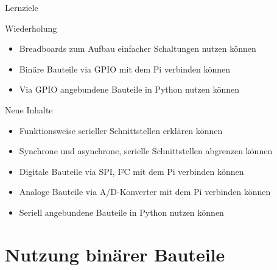 \begin{frame}{Lernziele}
    \begin{block}{Wiederholung}
        \begin{itemize}
            \item Breadboards zum Aufbau einfacher Schaltungen nutzen können
            \item Binäre Bauteile via GPIO mit dem Pi verbinden können
            \item Via GPIO angebundene Bauteile in Python nutzen können
        \end{itemize}
    \end{block}

    \begin{block}{Neue Inhalte}
        \begin{itemize}
            \item Funktionsweise serieller Schnittstellen erklären können
            \item Synchrone und asynchrone, serielle Schnittstellen abgrenzen können
            \item Digitale Bauteile via SPI, I²C mit dem Pi verbinden können
            \item Analoge Bauteile via A/D-Konverter mit dem Pi verbinden können
            \item Seriell angebundene Bauteile in Python nutzen können
        \end{itemize}
    \end{block}
\end{frame}

\section{Nutzung binärer Bauteile}

